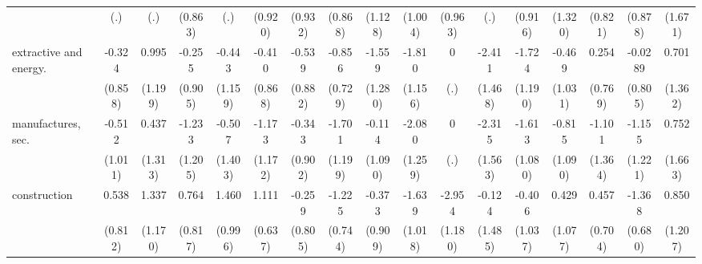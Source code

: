 {\begin{tabular}{l*{16}{c}}
                    &         (.)         &         (.)         &     (0.863)         &         (.)         &     (0.920)         &     (0.932)         &     (0.868)         &     (1.128)         &     (1.004)         &     (0.963)         &         (.)         &     (0.916)         &     (1.320)         &     (0.821)         &     (0.878)         &     (1.671)         \\
[1em]
extractive and energy.&      -0.324         &       0.995         &      -0.255         &      -0.443         &      -0.410         &      -0.539         &      -0.856         &      -1.559         &      -1.810         &           0         &      -2.411         &      -1.724         &      -0.469         &       0.254         &     -0.0289         &       0.701         \\
                    &     (0.858)         &     (1.199)         &     (0.905)         &     (1.159)         &     (0.868)         &     (0.882)         &     (0.729)         &     (1.280)         &     (1.156)         &         (.)         &     (1.468)         &     (1.190)         &     (1.031)         &     (0.769)         &     (0.805)         &     (1.362)         \\
[1em]
manufactures, sec.  &      -0.512         &       0.437         &      -1.233         &      -0.507         &      -1.173         &      -0.343         &      -1.701         &      -0.114         &      -2.080         &           0         &      -2.315         &      -1.613         &      -0.815         &      -1.101         &      -1.155         &       0.752         \\
                    &     (1.011)         &     (1.313)         &     (1.205)         &     (1.403)         &     (1.172)         &     (0.902)         &     (1.199)         &     (1.090)         &     (1.259)         &         (.)         &     (1.563)         &     (1.080)         &     (1.090)         &     (1.364)         &     (1.221)         &     (1.663)         \\
[1em]
construction        &       0.538         &       1.337         &       0.764         &       1.460         &       1.111         &      -0.259         &      -1.225         &      -0.373         &      -1.639         &      -2.954\sym{*}  &      -0.124         &      -0.406         &       0.429         &       0.457         &      -1.368\sym{*}  &       0.850         \\
                    &     (0.812)         &     (1.170)         &     (0.817)         &     (0.996)         &     (0.637)         &     (0.805)         &     (0.744)         &     (0.909)         &     (1.018)         &     (1.180)         &     (1.485)         &     (1.037)         &     (1.077)         &     (0.704)         &     (0.680)         &     (1.207)         \\

\end{tabular}}
